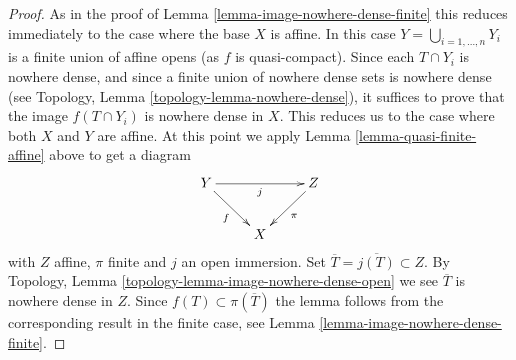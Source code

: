 \documentclass[10pt,a4paper]{amsart}
\theoremstyle{plain}
\theoremstyle{definition}
\theoremstyle{remark}
\numberwithin{equation}{subsection}
\begin{document}
\begin{proof}
As in the proof of Lemma \ref{lemma-image-nowhere-dense-finite} this
reduces immediately to the case where the base $X$ is affine.
In this case $Y = \bigcup_{i = 1, \ldots, n} Y_i$ is a finite union
of affine opens (as $f$ is quasi-compact). Since each $T \cap Y_i$
is nowhere dense, and since a finite union of nowhere dense sets is
nowhere dense (see
Topology, Lemma \ref{topology-lemma-nowhere-dense}),
it suffices to prove that the image $f(T \cap Y_i)$ is nowhere dense in $X$.
This reduces us to the case where both $X$ and $Y$ are affine. At this point
we apply Lemma \ref{lemma-quasi-finite-affine} above to get a diagram
$$
\xymatrix{
Y \ar[rd]_f \ar[rr]_j & & Z \ar[ld]^\pi \\
& X &
}
$$
with $Z$ affine, $\pi$ finite and $j$ an open immersion.
Set $\overline{T} = \overline{j(T)} \subset Z$. By
Topology, Lemma \ref{topology-lemma-image-nowhere-dense-open}
we see $\overline{T}$ is nowhere dense in $Z$.
Since $f(T) \subset \pi(\overline{T})$
the lemma follows from the corresponding result in the finite case, see
Lemma \ref{lemma-image-nowhere-dense-finite}.
\end{proof}
\end{document}
